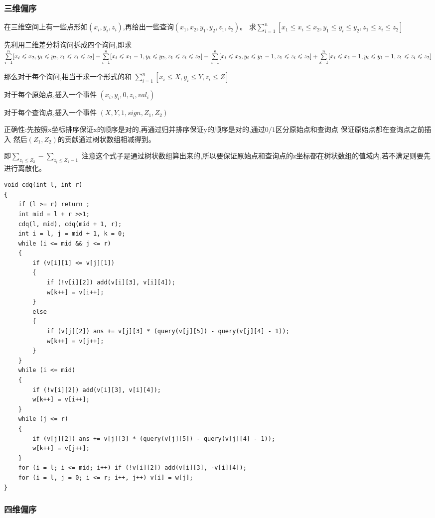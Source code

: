 \documentclass[a4paper, fontset=none]{ctexart}
\begin{document}
\subsubsection{三维偏序}
在三维空间上有一些点形如$(x_i, y_i, z_i)$,再给出一些查询$(x_1, x_2, y_1, y_2, z_1, z_2)$。
求$\sum\limits_{i=1}^n[x_1\leqslant x_i\leqslant x_2, y_1\leqslant y_i\leqslant y_2, z_1\leqslant z_i\leqslant z_2]$

先利用二维差分将询问拆成四个询问,即求$\sum\limits_{i=1}^n[x_i\leqslant x_2, y_i\leqslant y_2, z_1\leqslant z_i\leqslant z_2]-
\sum\limits_{i=1}^n[x_i\leqslant x_1-1, y_i\leqslant y_2, z_1\leqslant z_i\leqslant z_2]-
\\\sum\limits_{i=1}^n[x_i\leqslant x_2, y_i\leqslant y_1-1, z_1\leqslant z_i\leqslant z_2]+
\sum\limits_{x=1}^n[x_i\leqslant x_1-1, y_i\leqslant y_1-1, z_1\leqslant z_i\leqslant z_2]$

那么对于每个询问,相当于求一个形式的和 $\sum\limits_{i=1}^n[x_i\leqslant X, y_i\leqslant Y, z_i\leqslant Z]$

对于每个原始点,插入一个事件 $(x_i, y_i, 0, z_i, val_i)$

对于每个查询点,插入一个事件 $(X, Y, 1, sign, Z_1, Z_2)$

正确性:先按照x坐标排序保证x的顺序是对的,再通过归并排序保证y的顺序是对的,通过$0/1$区分原始点和查询点 
保证原始点都在查询点之前插入 然后$(Z_1, Z_2)$的贡献通过树状数组相减得到。

即$\sum\limits_{z_i\leqslant Z_2}-\sum\limits_{z_i\leqslant Z_1-1}$  
注意这个式子是通过树状数组算出来的,所以要保证原始点和查询点的z坐标都在树状数组的值域内,若不满足则要先进行离散化。
\begin{verbatim}
void cdq(int l, int r)
{
    if (l >= r) return ;
    int mid = l + r >>1;
    cdq(l, mid), cdq(mid + 1, r);
    int i = l, j = mid + 1, k = 0;
    while (i <= mid && j <= r)
    {
        if (v[i][1] <= v[j][1])
        {
            if (!v[i][2]) add(v[i][3], v[i][4]);
            w[k++] = v[i++];
        }
        else
        {
            if (v[j][2]) ans += v[j][3] * (query(v[j][5]) - query(v[j][4] - 1));
            w[k++] = v[j++];
        }
    }
    while (i <= mid)
    {
        if (!v[i][2]) add(v[i][3], v[i][4]);
        w[k++] = v[i++];
    }
    while (j <= r)
    {
        if (v[j][2]) ans += v[j][3] * (query(v[j][5]) - query(v[j][4] - 1));
        w[k++] = v[j++];
    }
    for (i = l; i <= mid; i++) if (!v[i][2]) add(v[i][3], -v[i][4]);
    for (i = l, j = 0; i <= r; i++, j++) v[i] = w[j];
}
\end{verbatim}
\subsubsection{四维偏序}
\end{document}
